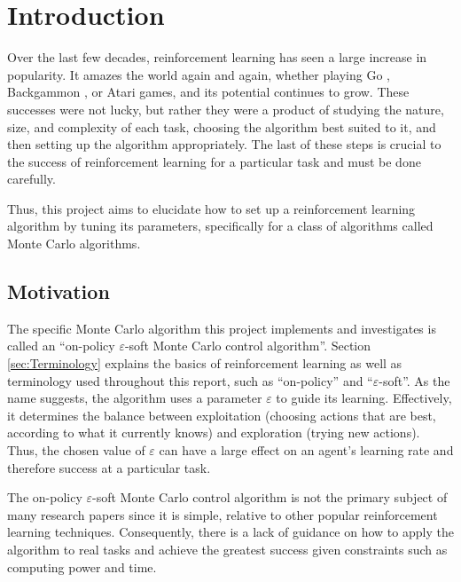 \documentclass[11pt,a4paper]{report}
\begin{document}
\shipout\null


\tableofcontents


\chapter{Introduction}

Over the last few decades, reinforcement learning has seen a large increase in popularity. It amazes the world again and again, whether playing Go \cite{go}, Backgammon \cite{backgammon}, or Atari \cite{atari} games, and its potential continues to grow. These successes were not lucky, but rather they were a product of studying the nature, size, and complexity of each task, choosing the algorithm best suited to it, and then setting up the algorithm appropriately. The last of these steps is crucial to the success of reinforcement learning for a particular task and must be done carefully.

Thus, this project aims to elucidate how to set up a reinforcement learning algorithm by tuning its parameters, specifically for a class of algorithms called Monte Carlo algorithms.


\section{Motivation}

The specific Monte Carlo algorithm this project implements and investigates is called an ``on-policy $\varepsilon$-soft Monte Carlo control algorithm''. Section \ref{sec:Terminology} explains the basics of reinforcement learning as well as terminology used throughout this report, such as ``on-policy'' and ``$\varepsilon$-soft''. As the name suggests, the algorithm uses a parameter $\varepsilon$ to guide its learning. Effectively, it determines the balance between exploitation (choosing actions that are best, according to what it currently knows) and exploration (trying new actions). Thus, the chosen value of $\varepsilon$ can have a large effect on an agent's learning rate and therefore success at a particular task.

The on-policy $\varepsilon$-soft Monte Carlo control algorithm is not the primary subject of many research papers since it is simple, relative to other popular reinforcement learning techniques. Consequently, there is a lack of guidance on how to apply the algorithm to real tasks and achieve the greatest success given constraints such as computing power and time.
\end{document}
